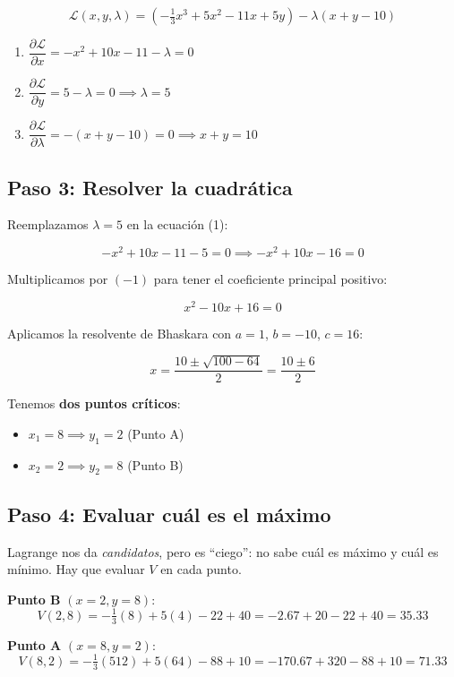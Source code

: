\documentclass[12pt]{article}
\begin{document}
\[
\mathcal{L}(x, y, \lambda) = \left(-\tfrac{1}{3}x^3 + 5x^2 - 11x + 5y\right) - \lambda(x + y - 10)
\]

\begin{enumerate}
    \item $\dfrac{\partial \mathcal{L}}{\partial x} = -x^2 + 10x - 11 - \lambda = 0$
    \item $\dfrac{\partial \mathcal{L}}{\partial y} = 5 - \lambda = 0 \implies \lambda = 5$
    \item $\dfrac{\partial \mathcal{L}}{\partial \lambda} = -(x + y - 10) = 0 \implies x + y = 10$
\end{enumerate}

\subsection{Paso 3: Resolver la cuadrática}

Reemplazamos $\lambda = 5$ en la ecuación (1):

\[
-x^2 + 10x - 11 - 5 = 0 \implies -x^2 + 10x - 16 = 0
\]

Multiplicamos por $(-1)$ para tener el coeficiente principal positivo:

\[
x^2 - 10x + 16 = 0
\]

Aplicamos la resolvente de Bhaskara con $a=1$, $b=-10$, $c=16$:

\[
x = \frac{10 \pm \sqrt{100 - 64}}{2} = \frac{10 \pm 6}{2}
\]

Tenemos \textbf{dos puntos críticos}:

\begin{itemize}
    \item $x_1 = 8 \implies y_1 = 2$ (Punto A)
    \item $x_2 = 2 \implies y_2 = 8$ (Punto B)
\end{itemize}

\subsection{Paso 4: Evaluar cuál es el máximo}

Lagrange nos da \textit{candidatos}, pero es ``ciego'': no sabe cuál es máximo y cuál es mínimo. Hay que evaluar $V$ en cada punto.

\vspace{0.5em}

\textbf{Punto B} $(x=2, y=8)$:
\[
V(2, 8) = -\tfrac{1}{3}(8) + 5(4) - 22 + 40 = -2.67 + 20 - 22 + 40 = 35.33
\]

\textbf{Punto A} $(x=8, y=2)$:
\[
V(8, 2) = -\tfrac{1}{3}(512) + 5(64) - 88 + 10 = -170.67 + 320 - 88 + 10 = 71.33
\]
\end{document}
